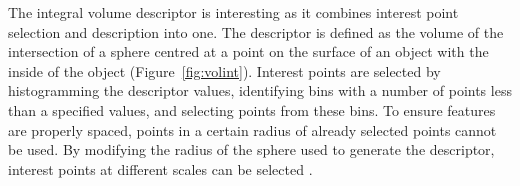 \documentclass[11pt,a4paper]{kth-mag}
\begin{document}
The integral volume descriptor is interesting as it combines interest point
selection and description into one. The descriptor is defined as the volume of
the intersection of a sphere centred at a point on the surface of an object with
the inside of the object (Figure~\ref{fig:volint}). Interest points are selected
by histogramming the descriptor values, identifying bins with a number of points
less than a specified values, and selecting points from these bins. To ensure
features are properly spaced, points in a certain radius of already selected
points cannot be used. By modifying the radius of the sphere used to generate
the descriptor, interest points at different scales can be selected
\cite{gelfand2005robust}.


\end{document}
